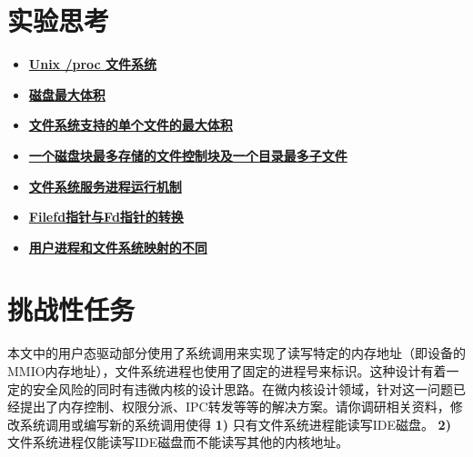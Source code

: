 \section{实验思考}

\begin{itemize}
\item \hyperref[think-proc]{\textbf{\textcolor{baseB}{Unix /proc 文件系统}}}
\item \hyperref[think-disksize]{\textbf{\textcolor{baseB}{磁盘最大体积}}}
\item \hyperref[think-filesize]{\textbf{\textcolor{baseB}{文件系统支持的单个文件的最大体积}}}
\item \hyperref[think-filenum]{\textbf{\textcolor{baseB}{一个磁盘块最多存储的文件控制块及一个目录最多子文件}}}
\item \hyperref[think-fs-serve]{\textbf{\textcolor{baseB}{文件系统服务进程运行机制}}}
\item \hyperref[think-Filefd-Fd]{\textbf{\textcolor{baseB}{Filefd指针与Fd指针的转换}}}
\item \hyperref[think-fileid]{\textbf{\textcolor{baseB}{用户进程和文件系统映射的不同}}}
\end{itemize}


\section{挑战性任务}

本文中的用户态驱动部分使用了系统调用来实现了读写特定的内存地址（即设备的MMIO内存地址），文件系统进程也使用了固定的进程号来标识。这种设计有着一定的安全风险的同时有违微内核的设计思路。在微内核设计领域，针对这一问题已经提出了内存控制、权限分派、IPC转发等等的解决方案。请你调研相关资料，修改系统调用或编写新的系统调用使得 \textbf{1)} 只有文件系统进程能读写IDE磁盘。 \textbf{2)} 文件系统进程仅能读写IDE磁盘而不能读写其他的内核地址。





